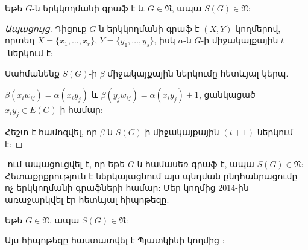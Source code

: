 \begin{remark}
\label{r3_S(G)} Եթե $G$-ն երկկողմանի գրաֆ է և $G\in
\mathfrak{N}$, ապա $S(G)\in \mathfrak{N}$:
\end{remark}
\begin{proof}[Ապացույց]
Դիցուք $G$-ն երկկողմանի գրաֆ է $(X,Y)$ կողմերով, որտեղ
$X=\{x_{1},\ldots,x_{r}\}$, $Y=\{y_{1},\ldots,y_{s}\}$, իսկ 
$\alpha$-ն $G$-ի միջակայքային $t$-ներկում է:

Սահմանենք $S(G)$-ի $\beta$ միջակայքային ներկումը հետևյալ կերպ.
\begin{center}
$\beta(x_{i}w_{ij})=\alpha(x_{i}y_{j})$ և
$\beta(y_{j}w_{ij})=\alpha(x_{i}y_{j})+1$, ցանկացած $x_{i}y_{j}\in
E(G)$-ի համար:
\end{center}

Հեշտ է համոզվել, որ $\beta$-ն $S(G)$-ի միջակայքային $(t+1)$-ներկում է:
\end{proof}

\cite{HansonLotenToft1998, KamalianMirumyan1997}-ում ապացուցվել է, որ եթե $G$-ն համասեռ գրաֆ է, ապա $S(G)\in \mathfrak{N}$: Հետաքրքրություն է ներկայացնում այս պնդման ընդհանրացումը ոչ երկկողմանի գրաֆների համար: Մեր կողմից 2014-ին \cite{PetrosyanKhachatrian2014} առաջարկվել էր հետևյալ հիպոթեզը.

\begin{hypothesis}
Եթե $G\in \mathfrak{N}$, ապա $S(G)\in \mathfrak{N}$:
\end{hypothesis}

Այս հիպոթեզը հաստատվել է Պյատկինի կողմից \cite{Pyatkin2015}:

